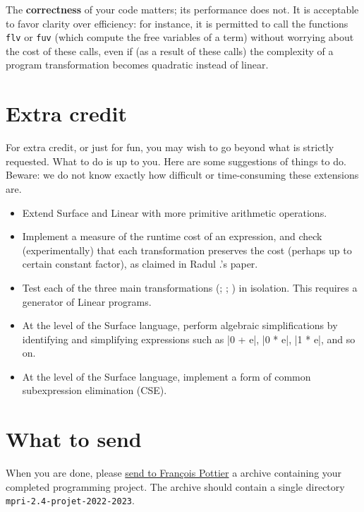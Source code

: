 \documentclass{article}
\begin{document}
The \textbf{correctness} of your code matters;
its performance does not.
It is acceptable to favor clarity over efficiency:
for instance,
it is permitted to call the functions \texttt{flv} or \texttt{fuv}
(which compute the free variables of a term)
without worrying about the cost of these calls,
even if (as a result of these calls)
the complexity of a program transformation becomes
quadratic instead of linear.


\section{Extra credit}

For extra credit, or just for fun, you may wish to go beyond what is strictly
requested. What to do is up to you. Here are some suggestions of things to do.
Beware: we do not know exactly how difficult or time-consuming these
extensions are.
%
\begin{itemize}
\item Extend Surface and Linear with more primitive arithmetic operations.
\item Implement a measure of the runtime cost of an expression,
      and check (experimentally) that each transformation preserves the cost
      (perhaps up to certain constant factor),
      as claimed in Radul \etal.'s paper.
\item Test each of the three main transformations
      (\fmad; \unzipping; \transposition) in isolation.
      This requires a generator of Linear programs.
\item At the level of the Surface language,
      perform algebraic simplifications by identifying
      and simplifying expressions such as \oc|0 + e|,
      \oc|0 * e|, \oc|1 * e|, and so on.
\item At the level of the Surface language,
      implement a form of common subexpression elimination (CSE).
\end{itemize}


\section{What to send}

When you are done, please \href{mailto:francois.pottier@inria.fr}{send to
  François Pottier} a  archive containing your completed
programming project. The archive should contain a single
directory \texttt{mpri-2.4-projet-2022-2023}.
\end{document}
